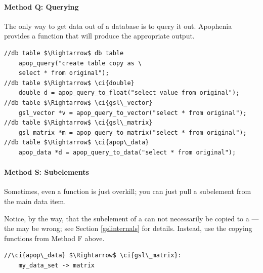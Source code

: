 \paragraph{Method Q: Querying}
 
 
The only way to get data out of a database is to query it out. Apophenia
provides a function that will produce the appropriate output.

\begin{lstlisting}
//db table $\Rightarrow$ db table
    apop_query("create table copy as \
    select * from original");
//db table $\Rightarrow$ \ci{double}
    double d = apop_query_to_float("select value from original");
//db table $\Rightarrow$ \ci{gsl\_vector}
    gsl_vector *v = apop_query_to_vector("select * from original");
//db table $\Rightarrow$ \ci{gsl\_matrix}
    gsl_matrix *m = apop_query_to_matrix("select * from original");
//db table $\Rightarrow$ \ci{apop\_data}
    apop_data *d = apop_query_to_data("select * from original");
\end{lstlisting}


\paragraph{Method S: Subelements} Sometimes, even a function is just
overkill; you can just pull a subelement from the main data item.

Notice, by the way, that the  subelement of a
 can not necessarily be copied to a
---the  may be wrong; see Section
\ref{gslinternals}
for details. Instead, use the copying functions from Method F above.

\begin{lstlisting}
//\ci{apop\_data} $\Rightarrow$ \ci{gsl\_matrix}:
    my_data_set -> matrix
\end{lstlisting}
\lstset{texcl=false}



